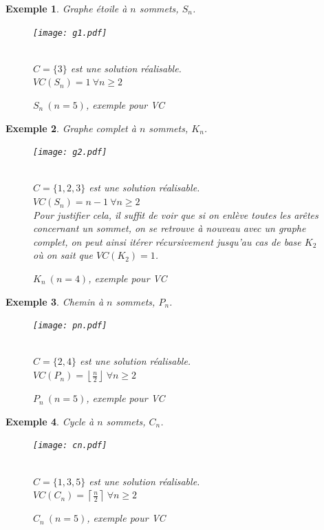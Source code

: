 \documentclass[12pt]{article}
\newcommand{\ceil}[1]{\left\lceil #1 \right\rceil}
\newcommand{\cdil}[1]{\left\lfloor #1 \right\rfloor}
\newtheorem{exemple}{Exemple}[section]
\begin{document}
\begin{exemple}
Graphe étoile à $n$ sommets, $S_n$.\\
\begin{figure}[H]
    \begin{center}
    \texttt{[image: g1.pdf]}
    \caption{$S_n\ (n=5)$, exemple pour VC}
    $ $ \\
	$C = \{3\}$ est une solution réalisable. \\
	$VC(S_n)=1\ \forall n \geq 2$
    \end{center}
\end{figure}
\end{exemple}
\begin{exemple}
Graphe complet à $n$ sommets, $K_n$.\\
\begin{figure}[H]
    \begin{center}
    \texttt{[image: g2.pdf]}
    \caption{$K_n\ (n=4)$, exemple pour VC}
    $ $ \\
	$C = \{1,2,3\}$ est une solution réalisable. \\
	$VC(S_n)=n-1\ \forall n \geq 2$ \\
	Pour justifier cela, il suffit de voir que si on enlève toutes les arêtes
    concernant un sommet, on se retrouve à nouveau
	avec un graphe complet, on peut ainsi itérer récursivement jusqu'au cas de
    base $K_2$ où on sait que $VC(K_2) = 1$.
    \end{center}
\end{figure}
\end{exemple}

\begin{exemple}
Chemin à $n$ sommets, $P_n$.\\
\begin{figure}[H]
    \begin{center}
    \texttt{[image: pn.pdf]}
    \caption{$P_n\ (n=5)$, exemple pour VC}
    $ $ \\
	$C = \{2,4\}$ est une solution réalisable. \\
	$VC(P_n)=\cdil{\frac{n}{2}}\ \forall n \geq 2$
    \end{center}
\end{figure}
\end{exemple}

\begin{exemple}
Cycle à $n$ sommets, $C_n$.\\
\begin{figure}[H]
    \begin{center}
    \texttt{[image: cn.pdf]}
    \caption{$C_n\ (n=5)$, exemple pour VC}
    $ $ \\
	$C = \{1,3,5\}$ est une solution réalisable. \\
	$VC(C_n)=\ceil{\frac{n}{2}}\ \forall n \geq 2$
    \end{center}
\end{figure}
\end{exemple}
\end{document}
